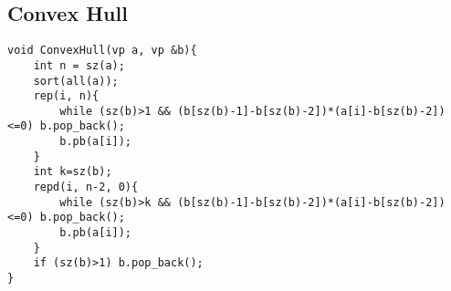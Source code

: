 \subsection{Convex Hull}
\begin{lstlisting}
void ConvexHull(vp a, vp &b){   
    int n = sz(a);
    sort(all(a)); 
    rep(i, n){
        while (sz(b)>1 && (b[sz(b)-1]-b[sz(b)-2])*(a[i]-b[sz(b)-2])<=0) b.pop_back();
        b.pb(a[i]);
    }
    int k=sz(b);
    repd(i, n-2, 0){
        while (sz(b)>k && (b[sz(b)-1]-b[sz(b)-2])*(a[i]-b[sz(b)-2])<=0) b.pop_back();
        b.pb(a[i]);
    }
    if (sz(b)>1) b.pop_back();
}

\end{lstlisting}
